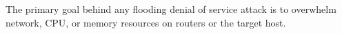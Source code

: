 The primary goal behind any flooding denial of service attack is to overwhelm network, CPU, or memory resources on routers or the target host.







